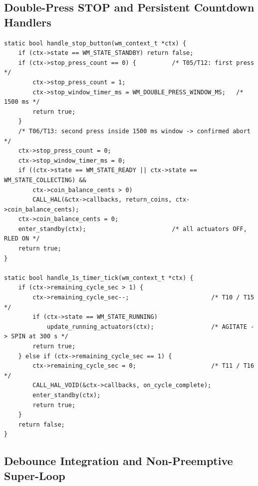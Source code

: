 \subsection{Double-Press STOP and Persistent Countdown Handlers}

\begin{lstlisting}[caption={Double-press STOP evaluation and 1-second down-counter}]
static bool handle_stop_button(wm_context_t *ctx) {
    if (ctx->state == WM_STATE_STANDBY) return false;
    if (ctx->stop_press_count == 0) {          /* T05/T12: first press */
        ctx->stop_press_count = 1;
        ctx->stop_window_timer_ms = WM_DOUBLE_PRESS_WINDOW_MS;   /* 1500 ms */
        return true;
    }
    /* T06/T13: second press inside 1500 ms window -> confirmed abort */
    ctx->stop_press_count = 0;
    ctx->stop_window_timer_ms = 0;
    if ((ctx->state == WM_STATE_READY || ctx->state == WM_STATE_COLLECTING) &&
        ctx->coin_balance_cents > 0)
        CALL_HAL(&ctx->callbacks, return_coins, ctx->coin_balance_cents);
    ctx->coin_balance_cents = 0;
    enter_standby(ctx);                        /* all actuators OFF, RLED ON */
    return true;
}

static bool handle_1s_timer_tick(wm_context_t *ctx) {
    if (ctx->remaining_cycle_sec > 1) {
        ctx->remaining_cycle_sec--;                       /* T10 / T15 */
        if (ctx->state == WM_STATE_RUNNING)
            update_running_actuators(ctx);                /* AGITATE -> SPIN at 300 s */
        return true;
    } else if (ctx->remaining_cycle_sec == 1) {
        ctx->remaining_cycle_sec = 0;                     /* T11 / T16 */
        CALL_HAL_VOID(&ctx->callbacks, on_cycle_complete);
        enter_standby(ctx);
        return true;
    }
    return false;
}
\end{lstlisting}

\subsection{Debounce Integration and Non-Preemptive Super-Loop}


